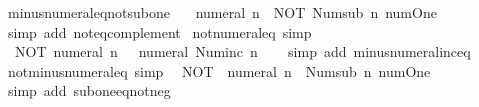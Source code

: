 \begin{isabellebody}
\endisatagproof
{\isafoldproof}%
%
\isadelimproof
\isanewline
%
\endisadelimproof
\isanewline
{}\isamarkupfalse%
\ minus{\isacharunderscore}{\kern0pt}numeral{\isacharunderscore}{\kern0pt}eq{\isacharunderscore}{\kern0pt}not{\isacharunderscore}{\kern0pt}sub{\isacharunderscore}{\kern0pt}one{\isacharcolon}{\kern0pt}\isanewline
\ \ {\isacartoucheopen}{\isacharminus}{\kern0pt}\ numeral\ n\ {\isacharequal}{\kern0pt}\ NOT\ {\isacharparenleft}{\kern0pt}Num{\isachardot}{\kern0pt}sub\ n\ num{\isachardot}{\kern0pt}One{\isacharparenright}{\kern0pt}{\isacartoucheclose}\isanewline
%
\isadelimproof
\ \ %
\endisadelimproof
%
\isatagproof
{}\isamarkupfalse%
\ {\isacharparenleft}{\kern0pt}simp\ add{\isacharcolon}{\kern0pt}\ not{\isacharunderscore}{\kern0pt}eq{\isacharunderscore}{\kern0pt}complement{\isacharparenright}{\kern0pt}%
\endisatagproof
{\isafoldproof}%
%
\isadelimproof
\isanewline
%
\endisadelimproof
\isanewline
{}\isamarkupfalse%
\ not{\isacharunderscore}{\kern0pt}numeral{\isacharunderscore}{\kern0pt}eq\ {\isacharbrackleft}{\kern0pt}simp{\isacharbrackright}{\kern0pt}{\isacharcolon}{\kern0pt}\isanewline
\ \ {\isacartoucheopen}NOT\ {\isacharparenleft}{\kern0pt}numeral\ n{\isacharparenright}{\kern0pt}\ {\isacharequal}{\kern0pt}\ {\isacharminus}{\kern0pt}\ numeral\ {\isacharparenleft}{\kern0pt}Num{\isachardot}{\kern0pt}inc\ n{\isacharparenright}{\kern0pt}{\isacartoucheclose}\isanewline
%
\isadelimproof
\ \ %
\endisadelimproof
%
\isatagproof
{}\isamarkupfalse%
\ {\isacharparenleft}{\kern0pt}simp\ add{\isacharcolon}{\kern0pt}\ minus{\isacharunderscore}{\kern0pt}numeral{\isacharunderscore}{\kern0pt}inc{\isacharunderscore}{\kern0pt}eq{\isacharparenright}{\kern0pt}%
\endisatagproof
{\isafoldproof}%
%
\isadelimproof
\isanewline
%
\endisadelimproof
\isanewline
{}\isamarkupfalse%
\ not{\isacharunderscore}{\kern0pt}minus{\isacharunderscore}{\kern0pt}numeral{\isacharunderscore}{\kern0pt}eq\ {\isacharbrackleft}{\kern0pt}simp{\isacharbrackright}{\kern0pt}{\isacharcolon}{\kern0pt}\isanewline
\ \ {\isacartoucheopen}NOT\ {\isacharparenleft}{\kern0pt}{\isacharminus}{\kern0pt}\ numeral\ n{\isacharparenright}{\kern0pt}\ {\isacharequal}{\kern0pt}\ Num{\isachardot}{\kern0pt}sub\ n\ num{\isachardot}{\kern0pt}One{\isacartoucheclose}\isanewline
%
\isadelimproof
\ \ %
\endisadelimproof
%
\isatagproof
{}\isamarkupfalse%
\ {\isacharparenleft}{\kern0pt}simp\ add{\isacharcolon}{\kern0pt}\ sub{\isacharunderscore}{\kern0pt}one{\isacharunderscore}{\kern0pt}eq{\isacharunderscore}{\kern0pt}not{\isacharunderscore}{\kern0pt}neg{\isacharparenright}{\kern0pt}%

\end{isabellebody}
